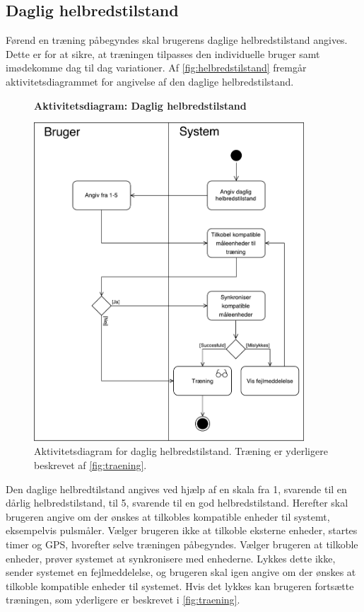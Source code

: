 \subsection*{Daglig helbredstilstand}
Førend en træning påbegyndes skal brugerens daglige helbredstilstand angives. Dette er for at sikre, at træningen tilpasses den individuelle bruger samt imødekomme dag til dag variationer. Af \autoref{fig:helbredstilstand} fremgår aktivitetsdiagrammet for angivelse af den daglige helbredstilstand. 

\begin{figure} [H]
\centering
\textbf{Aktivitetsdiagram: Daglig helbredstilstand}\par\medskip
\includegraphics[width=0.9\textwidth]{figures/aktivitetsdiagram/NYHelbredstilstand}
\caption{Aktivitetsdiagram for daglig helbredstilstand. Træning er yderligere beskrevet af \autoref{fig:traening}.}
\label{fig:helbredstilstand}
\end{figure}

\noindent
Den daglige helbredtilstand angives ved hjælp af en skala fra 1, svarende til en dårlig helbredstilstand, til 5, svarende til en god helbredstilstand. Herefter skal brugeren angive om der ønskes at tilkobles kompatible enheder til systemt, eksempelvis pulsmåler. Vælger brugeren ikke at tilkoble eksterne enheder, startes timer og GPS, hvorefter selve træningen påbegyndes. Vælger brugeren at tilkoble enheder, prøver systemet at synkronisere med enhederne. Lykkes dette ikke, sender systemet en fejlmeddelelse, og brugeren skal igen angive om der ønskes at tilkoble kompatible enheder til systemet. 
Hvis det lykkes kan brugeren fortsætte træningen, som yderligere er beskrevet i \autoref{fig:traening}. 


